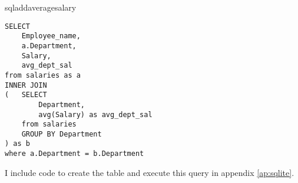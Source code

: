 \begin{subanswer}{sqladdaveragesalary}

\begin{verbatim}
SELECT
    Employee_name,
    a.Department,
    Salary,
    avg_dept_sal
from salaries as a
INNER JOIN
(   SELECT
        Department,
        avg(Salary) as avg_dept_sal
    from salaries
    GROUP BY Department
) as b
where a.Department = b.Department
\end{verbatim}
I include code to create the table and execute this query in appendix \ref{ap:sqlite}.
\end{subanswer}
